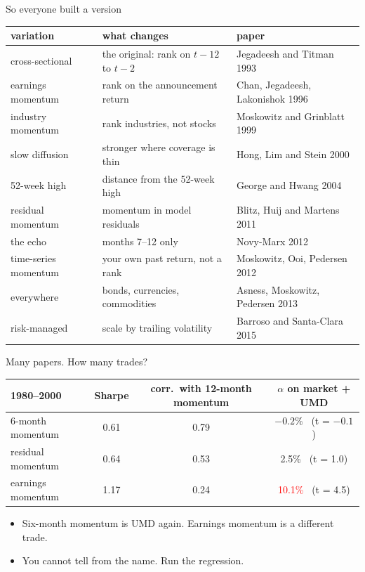 \documentclass[aspectratio=169,10pt]{beamer}
\begin{document}
\begin{frame}[label=many]{So everyone built a version}
\footnotesize
\renewcommand{\arraystretch}{1.3}
\begin{center}
\begin{tabular}{lll}
\toprule
variation & what changes & paper \\
\midrule
cross-sectional & the original: rank on $t-12$ to $t-2$ & Jegadeesh and Titman 1993 \\
earnings momentum & rank on the announcement return & Chan, Jegadeesh, Lakonishok 1996 \\
industry momentum & rank industries, not stocks & Moskowitz and Grinblatt 1999 \\
slow diffusion & stronger where coverage is thin & Hong, Lim and Stein 2000 \\
52-week high & distance from the 52-week high & George and Hwang 2004 \\
residual momentum & momentum in model residuals & Blitz, Huij and Martens 2011 \\
the echo & months 7--12 only & Novy-Marx 2012 \\
time-series momentum & your own past return, not a rank & Moskowitz, Ooi, Pedersen 2012 \\
everywhere & bonds, currencies, commodities & Asness, Moskowitz, Pedersen 2013 \\
risk-managed & scale by trailing volatility & Barroso and Santa-Clara 2015 \\
\bottomrule
\end{tabular}
\end{center}
\hfill \hyperlink{appendix_many}{}
\end{frame}

\begin{frame}{Many papers. How many trades?}
\begin{center}
\renewcommand{\arraystretch}{1.4}
\begin{tabular}{lccc}
\toprule
1980--2000 & Sharpe & corr.\ with 12-month momentum & $\alpha$ on market + UMD \\
\midrule
6-month momentum & 0.61 & 0.79 & $-0.2\%$ \ (t = $-0.1$) \\
residual momentum & 0.64 & 0.53 & \phantom{$-$}2.5\% \ (t = 1.0) \\
earnings momentum & 1.17 & 0.24 & \textcolor{red}{10.1\%} \ (t = 4.5) \\
\bottomrule
\end{tabular}
\end{center}
\vskip 10pt
\begin{itemize}
\item Six-month momentum is UMD again. Earnings momentum is a different trade.
\vskip 8pt
\item You cannot tell from the name. Run the regression.
\end{itemize}
\end{frame}
\end{document}
